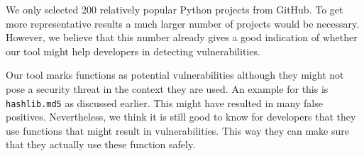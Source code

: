 We only selected 200 relatively popular Python projects from GitHub. To get more representative results a much larger number of projects would be necessary. However, we believe that this number already gives a good indication of whether our tool might help developers in detecting vulnerabilities.

Our tool marks functions as potential vulnerabilities although they might not pose a security threat in the context they are used. An example for this is \texttt{hashlib.md5} as discussed earlier. This might have resulted in many false positives. Nevertheless, we think it is still good to know for developers that they use functions that might result in vulnerabilities. This way they can make sure that they actually use these function safely.